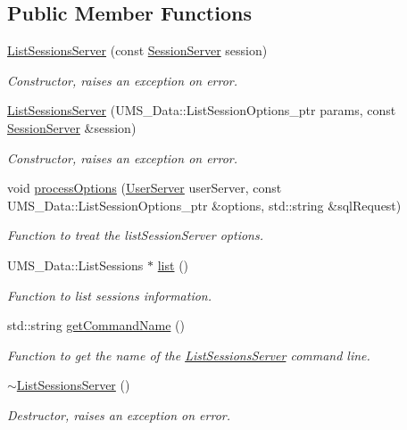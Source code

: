 \subsection*{Public Member Functions}
\begin{DoxyCompactItemize}
\item 
\hyperlink{classListSessionsServer_a980b56862f33b148887f6f8c0242600d}{ListSessionsServer} (const \hyperlink{classSessionServer}{SessionServer} session)
\begin{DoxyCompactList}\small\item\em Constructor, raises an exception on error. \item\end{DoxyCompactList}\item 
\hyperlink{classListSessionsServer_a3399184f6886eef7e7377e79b15ff699}{ListSessionsServer} (UMS\_\-Data::ListSessionOptions\_\-ptr params, const \hyperlink{classSessionServer}{SessionServer} \&session)
\begin{DoxyCompactList}\small\item\em Constructor, raises an exception on error. \item\end{DoxyCompactList}\item 
void \hyperlink{classListSessionsServer_aab6df9c91e10bfc063ced6d9c7836229}{processOptions} (\hyperlink{classUserServer}{UserServer} userServer, const UMS\_\-Data::ListSessionOptions\_\-ptr \&options, std::string \&sqlRequest)
\begin{DoxyCompactList}\small\item\em Function to treat the listSessionServer options. \item\end{DoxyCompactList}\item 
UMS\_\-Data::ListSessions $\ast$ \hyperlink{classListSessionsServer_a2ce41ba3a29999d9ef1799c990d29b29}{list} ()
\begin{DoxyCompactList}\small\item\em Function to list sessions information. \item\end{DoxyCompactList}\item 
std::string \hyperlink{classListSessionsServer_addba2aae3573750b1dc32220ec88dc94}{getCommandName} ()
\begin{DoxyCompactList}\small\item\em Function to get the name of the \hyperlink{classListSessionsServer}{ListSessionsServer} command line. \item\end{DoxyCompactList}\item 
\hypertarget{classListSessionsServer_acdebc991dbad38739e42cbe40f1774b6}{
\hyperlink{classListSessionsServer_acdebc991dbad38739e42cbe40f1774b6}{$\sim$ListSessionsServer} ()}
\label{classListSessionsServer_acdebc991dbad38739e42cbe40f1774b6}

\begin{DoxyCompactList}\small\item\em Destructor, raises an exception on error. \item\end{DoxyCompactList}\end{DoxyCompactItemize}
